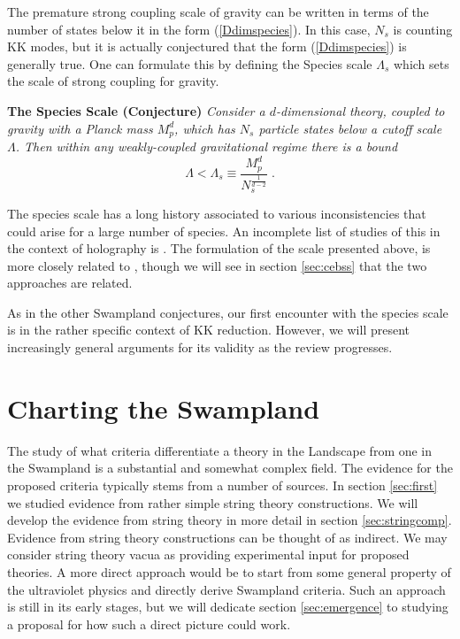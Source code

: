 \documentclass[11pt,a4paper]{article}
\numberwithin{equation}{section}
\numberwithin{table}{section}\setlength{\multlinegap}{25pt}
\newcommand{\be}{\begin{equation}}
\newcommand{\ee}{\end{equation}}
\begin{document}
The premature strong coupling scale of gravity can be written in terms of the number of states below it in the form (\ref{Ddimspecies}). In this case, $N_s$ is counting KK modes, but it is actually conjectured that the form (\ref{Ddimspecies}) is generally true. One can formulate this by defining the Species scale $\Lambda_s$ which sets the scale of strong coupling for gravity. 

\begin{tcolorbox}
{\bf The Species Scale (Conjecture)}
\newline
\newline
{\it 
Consider a $d$-dimensional theory, coupled to gravity with a Planck mass $M_p^d$, which has $N_s$ particle states below a cutoff scale $\Lambda$. Then within any weakly-coupled gravitational regime there is a bound
\be
\label{spscb}
\Lambda < \Lambda_s \equiv \frac{M^d_p}{N_s^{\frac{1}{d-2}}} \;.
\ee
}
\end{tcolorbox}

The species scale has a long history associated to various inconsistencies that could arise for a large number of species. An incomplete list of studies of this in the context of holography is \cite{PhysRevD.34.373,Bekenstein:1993dz,Jacobson:1994iw,Bekenstein:2000sw,Veneziano:2001ah}. The formulation of the scale presented above, is more closely related to \cite{Dvali:2001gx,ArkaniHamed:2005yv,Distler:2005hi,Dimopoulos:2005ac,Dvali:2007hz,Dvali:2009ks}, though we will see in section \ref{sec:cebss} that the two approaches are related.

As in the other Swampland conjectures, our first encounter with the species scale is in the rather specific context of KK reduction. However, we will present increasingly general arguments for its validity as the review progresses. 


\section{Charting the Swampland}
\label{sec:map}

The study of what criteria differentiate a theory in the Landscape from one in the Swampland is a substantial and somewhat complex field. The evidence for the proposed criteria typically stems from a number of sources. In section \ref{sec:first} we studied evidence from rather simple string theory constructions. We will develop the evidence from string theory in more detail in section \ref{sec:stringcomp}. Evidence from string theory constructions can be thought of as indirect. We may consider string theory vacua as providing experimental input for proposed theories. A more direct approach would be to start from some general property of the ultraviolet physics and directly derive Swampland criteria. Such an approach is still in its early stages, but we will dedicate section \ref{sec:emergence} to studying a proposal for how such a direct picture could work. 
\end{document}
